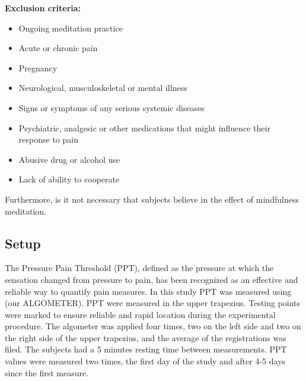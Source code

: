 \textbf{Exclusion criteria:}
\vspace{-.5cm}
\begin{itemize}
	\item Ongoing meditation practice 
	\vspace{-.3cm}
	\item Acute or chronic pain
	\vspace{-.3cm}
	\item Pregnancy 
	\vspace{-.3cm}
	\item Neurological, musculoskeletal or mental illness
	\vspace{-.3cm}
	\item Signs or symptoms of any serious systemic diseases 
	\vspace{-.3cm}
	\item Psychiatric, analgesic or other medications that might influence their response to pain 
		\vspace{-.3cm}
	\item Abusive drug or alcohol use
		\vspace{-.3cm}
	\item Lack of ability to cooperate
\end{itemize}

\vspace{-.5cm}
Furthermore, is it not necessary that subjects believe in the effect of mindfulness meditation.

\subsection{Setup}
The Pressure Pain Threshold (PPT), defined as the pressure at which the sensation changed from pressure to pain, has been recognized as an effective and reliable way to quantify pain measures. In this study PPT was measured using (our ALGOMETER). PPT were measured in the upper trapezius. Testing points were marked to ensure reliable and rapid location during the experimental procedure. 
The algometer was applied four times, two on the left side and two on the right side of the upper trapezius, and the average of the registrations was filed. The subjects had a 5 minutes resting time between measurements. PPT values were measured two times, the first day of the study and after 4-5 days since the first measure.

